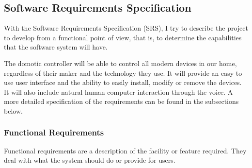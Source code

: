 \subsection{Software Requirements Specification}
With the Software Requirements Specification (SRS), I try to describe the project to develop from a functional point of view, that is,
to determine the capabilities that the software system will have.

The domotic controller will be able to control all modern devices in our home, regardless of their maker and the technology they use.
It will provide an easy to use user interface and the ability to easily install, modify or remove the devices. It will also include natural
human-computer interaction through the voice. A more detailed specification of the requirements can be found in the subsections
below.

\subsubsection{Functional Requirements}
Functional requirements are a description of the facility or feature required. They deal with what the system should do or provide 
for users.\cite{sqaFunctionalNonFunctional}


